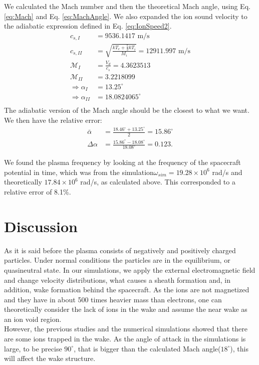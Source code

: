 \documentclass[aip, 
rsi, 
amsmath,
amssymb,
longbibliography,
reprint]{revtex4-1}
\begin{document}
We calculated the Mach number and then the theoretical Mach angle, using Eq. \ref{eq:Mach} and Eq. \ref{eq:MachAngle}. We also expanded the ion sound velocity to the adiabatic expression defined in Eq. \ref{eq:IonSpeed2}.
\begin{align*}
c_{s,I} &= 9536.1417 \, \, \text{m/s}\\
c_{s,II} &= \sqrt{\frac{kT_e + \frac{5}{3} k T_i}{ M_i}} = 12911.997 \, \, \text{m/s}\\
\mathcal{M}_{I} &= \frac{V_d}{c_s} = 4.3623513\\
\mathcal{M}_{II} &= 3.2218099\\
\Rightarrow \alpha_{I} &= 13.25 ^{\circ}\\
\Rightarrow \alpha_{II} &= 18.0824065 ^{\circ}\\
\end{align*}
The adiabatic version of the Mach angle should be the closest to what we want. We then have the relative error:
\begin{align*}
\bar{\alpha} &= \frac{18.46^{\circ} + 13.25^{\circ}}{2} = 15.86^{\circ}\\
\Delta \alpha &= \frac{15.86 ^{\circ}- 18.08^{\circ}}{18.08^{\circ}} = 0.123.
\end{align*}

We found the plasma frequency by looking at the frequency of the spacecraft potential in time, which was from the simulation$\omega_{sim} = 19.28\times10^{6}$ rad/s and theoretically $17.84\times 10^{6}$ rad/s, as calculated above. This corresponded to a relative error of 8.1\%.

\section{Discussion}

As it is said before the plasma consists of negatively and positively charged particles. Under normal conditions the particles are in the equilibrium, or quasineutral state. In our simulations, we apply the external electromagnetic field and change velocity distributions, what causes a sheath formation and, in addition, wake formation behind the spacecraft. As the ions are not magnetized and they have in about 500 times heavier mass than electrons, one can theoretically consider the lack of ions in the wake and assume the near wake as an ion void region.\\

However, the previous studies \cite{P1} and the numerical simulations showed that there are some ions trapped in the wake. As the angle of attack in the simulations is large, to be precise $90^{\circ}$, that is bigger than the calculated Mach angle($18^{\circ}$), this will affect the wake structure.\\
\end{document}
